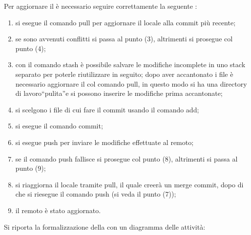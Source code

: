 					Per aggiornare il  è necessario seguire correttamente la seguente :
					\begin{enumerate}
						\item si esegue il comando  pull per aggiornare il  locale alla commit più recente;
						\item se sono avvenuti conflitti si passa al punto (3), altrimenti si prosegue col punto (4);
						\item con il comando  stash è possibile salvare le modifiche incomplete in uno stack separato per poterle riutilizzare in seguito; dopo aver accantonato i file è necessario aggiornare il  col comando  pull, in questo modo si ha una directory di lavoro“pulita”e si possono inserire le modifiche prima accantonate;
						\item si scelgono i file di cui fare il commit usando il comando  add;
						\item si esegue il comando  commit;
						\item si esegue  push per inviare le modifiche effettuate al  remoto;
						\item se il comando push fallisce si prosegue col punto (8), altrimenti si passa al punto (9);
						\item si riaggiorna il  locale tramite  pull, il quale creerà un merge commit, dopo di che si riesegue il comando push (si veda il punto (7));
						\item il  remoto è stato aggiornato.
					\end{enumerate}
					Si riporta la formalizzazione della  con un diagramma delle attività:
